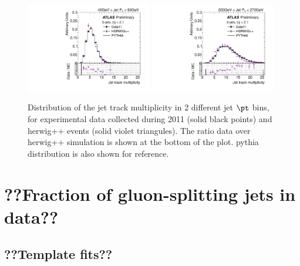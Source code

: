 \begin{figure}[tp]
\centering
\includegraphics[width=0.49\textwidth]{FIGS/systematics/DataVarNtrkPT040.pdf}
\includegraphics[width=0.49\textwidth]{FIGS/systematics/DataVarNtrkPT200.pdf}
\caption{Distribution of the jet track multiplicity in 2 different jet $\pt$ bins, for experimental data  collected during 2011 (solid black points) and {\sc herwig}++ events (solid violet triangules). The ratio data over {\sc herwig}++ simulation is shown at the bottom of the plot. {\sc pythia} distribution is also shown for reference.}
\label{fig:herwigdatamc}
\end{figure}



%
%
\chapter{??Fraction of gluon-splitting jets in data??}\label{ch:gbbfraction}

\section{??Template fits??}\label{sec:FractionSystematics}

